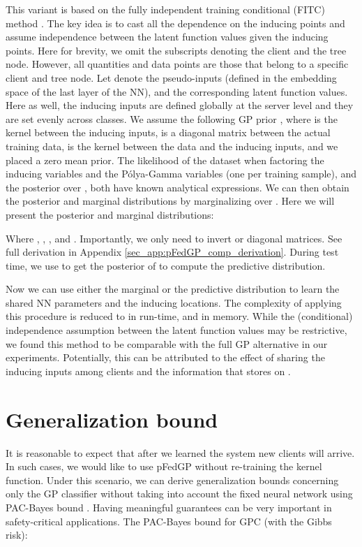 \documentclass{article}
\newcommand{\pg}{P\'olya-Gamma }
\begin{document}
This variant is based on the fully independent training conditional (FITC) method \cite{sneldon_Gharamani_IP}. The key idea is to cast all the dependence on the inducing points and assume independence between the latent function values given the inducing points. Here for brevity, we omit the subscripts denoting the client and the tree node. However, all quantities and data points are those that belong to a specific client and tree node. Let  denote the pseudo-inputs (defined in the embedding space of the last layer of the NN), and  the corresponding latent function values. Here as well, the inducing inputs are defined globally at the server level and they are set evenly across classes.
We assume the following GP prior , where  is the kernel between the inducing inputs,  is a diagonal matrix between the actual training data,  is the kernel between the data and the inducing inputs, and we placed a zero mean prior. The likelihood of the dataset when factoring the inducing variables and the \pg variables (one per training sample), and the posterior over , both have known analytical expressions. 
We can then obtain the posterior and marginal distributions by marginalizing over . Here we will present the posterior and marginal distributions:

Where , , , and . Importantly, we only need to invert  or diagonal matrices. See full derivation in Appendix \ref{sec_app:pFedGP_comp_derivation}. During test time, we use  to get the posterior of  to compute the predictive distribution. 

Now we can use either the marginal or the predictive distribution to learn the shared NN parameters and the inducing locations. The complexity of applying this procedure is reduced to  in run-time, and  in memory.
While the (conditional) independence assumption between the latent function values may be restrictive, we found this method to be comparable with the full GP alternative in our experiments. Potentially, this can be attributed to the effect of sharing the inducing inputs among clients and the information that  stores on . 




\section{Generalization bound} \label{sec:analysis}
It is reasonable to expect that after we learned the system new clients will arrive. In such cases, we would like to use pFedGP without re-training the kernel function. Under this scenario, we can derive generalization bounds concerning only the GP classifier without taking into account the fixed neural network using PAC-Bayes bound \cite{mcallester2003pac}. Having meaningful guarantees can be very important in safety-critical applications. The PAC-Bayes bound for GPC \cite{seeger2002pac}  (with the Gibbs risk):
\end{document}
